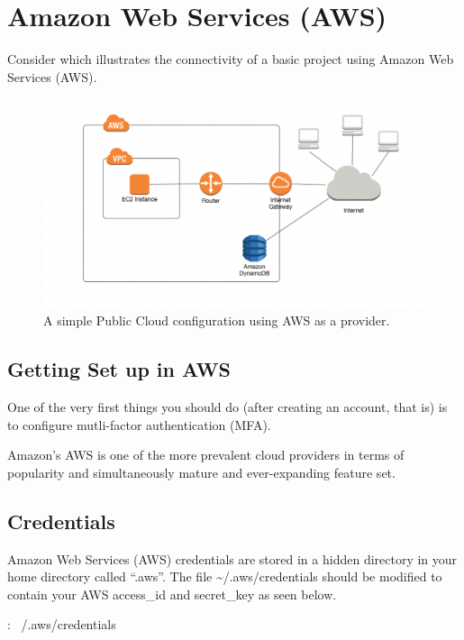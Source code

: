 \section{Amazon Web Services (AWS)}

\justify{}
Consider which illustrates the connectivity of a basic
project using Amazon Web Services (AWS).

\begin{figure}
  \includegraphics[scale=0.45]{../images/ddb-no-vpc-endpoint-1024x561.png}
  \caption{A simple Public Cloud configuration using AWS as a provider.}
\label{aws}
\end{figure}

\subsection{Getting Set up in AWS}

\justify{}
One of the very first things you should do (after creating an account,
that is) is to configure mutli-factor authentication (MFA).

\justify{}
Amazon's AWS is one of the more prevalent cloud providers in terms of
popularity and simultaneously mature and ever-expanding feature set.

\subsection{Credentials}
\justify{}
Amazon Web Services (AWS) credentials are stored in a hidden directory
in your home directory called ``.aws''. The file
\textasciitilde{}/.aws/credentials should be modified to contain your
AWS access\_id and secret\_key as seen below.

\begin{mybox}{\thetcbcounter: ~/.aws/credentials}
  
\end{mybox}

